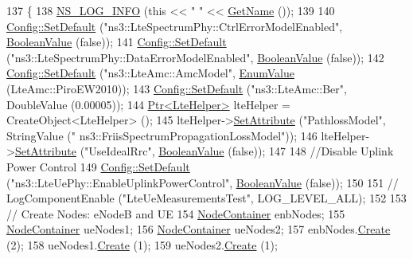 \begin{DoxyCode}
137 \{
138   \hyperlink{group__logging_gafbd73ee2cf9f26b319f49086d8e860fb}{NS\_LOG\_INFO} (\textcolor{keyword}{this} << \textcolor{stringliteral}{" "} << \hyperlink{classns3_1_1TestCase_a28f7bb59669c24dae1c290fc17fc9b62}{GetName} ());
139 
140   \hyperlink{group__config_ga2e7882df849d8ba4aaad31c934c40c06}{Config::SetDefault} (\textcolor{stringliteral}{"ns3::LteSpectrumPhy::CtrlErrorModelEnabled"}, 
      \hyperlink{classns3_1_1BooleanValue}{BooleanValue} (\textcolor{keyword}{false}));
141   \hyperlink{group__config_ga2e7882df849d8ba4aaad31c934c40c06}{Config::SetDefault} (\textcolor{stringliteral}{"ns3::LteSpectrumPhy::DataErrorModelEnabled"}, 
      \hyperlink{classns3_1_1BooleanValue}{BooleanValue} (\textcolor{keyword}{false}));
142   \hyperlink{group__config_ga2e7882df849d8ba4aaad31c934c40c06}{Config::SetDefault} (\textcolor{stringliteral}{"ns3::LteAmc::AmcModel"}, \hyperlink{classns3_1_1EnumValue}{EnumValue} (LteAmc::PiroEW2010));
143   \hyperlink{group__config_ga2e7882df849d8ba4aaad31c934c40c06}{Config::SetDefault} (\textcolor{stringliteral}{"ns3::LteAmc::Ber"}, DoubleValue (0.00005));
144   \hyperlink{classns3_1_1Ptr}{Ptr<LteHelper>} lteHelper = CreateObject<LteHelper> ();
145   lteHelper->\hyperlink{classns3_1_1ObjectBase_ac60245d3ea4123bbc9b1d391f1f6592f}{SetAttribute} (\textcolor{stringliteral}{"PathlossModel"}, StringValue (\textcolor{stringliteral}{"
      ns3::FriisSpectrumPropagationLossModel"}));
146   lteHelper->\hyperlink{classns3_1_1ObjectBase_ac60245d3ea4123bbc9b1d391f1f6592f}{SetAttribute} (\textcolor{stringliteral}{"UseIdealRrc"}, \hyperlink{classns3_1_1BooleanValue}{BooleanValue} (\textcolor{keyword}{false}));
147 
148   \textcolor{comment}{//Disable Uplink Power Control}
149   \hyperlink{group__config_ga2e7882df849d8ba4aaad31c934c40c06}{Config::SetDefault} (\textcolor{stringliteral}{"ns3::LteUePhy::EnableUplinkPowerControl"}, 
      \hyperlink{classns3_1_1BooleanValue}{BooleanValue} (\textcolor{keyword}{false}));
150 
151   \textcolor{comment}{// LogComponentEnable ("LteUeMeasurementsTest", LOG\_LEVEL\_ALL);}
152 
153   \textcolor{comment}{// Create Nodes: eNodeB and UE}
154   \hyperlink{classns3_1_1NodeContainer}{NodeContainer} enbNodes;
155   \hyperlink{classns3_1_1NodeContainer}{NodeContainer} ueNodes1;
156   \hyperlink{classns3_1_1NodeContainer}{NodeContainer} ueNodes2;
157   enbNodes.\hyperlink{classns3_1_1NodeContainer_a787f059e2813e8b951cc6914d11dfe69}{Create} (2);
158   ueNodes1.\hyperlink{classns3_1_1NodeContainer_a787f059e2813e8b951cc6914d11dfe69}{Create} (1);
159   ueNodes2.\hyperlink{classns3_1_1NodeContainer_a787f059e2813e8b951cc6914d11dfe69}{Create} (1);

\end{DoxyCode}
